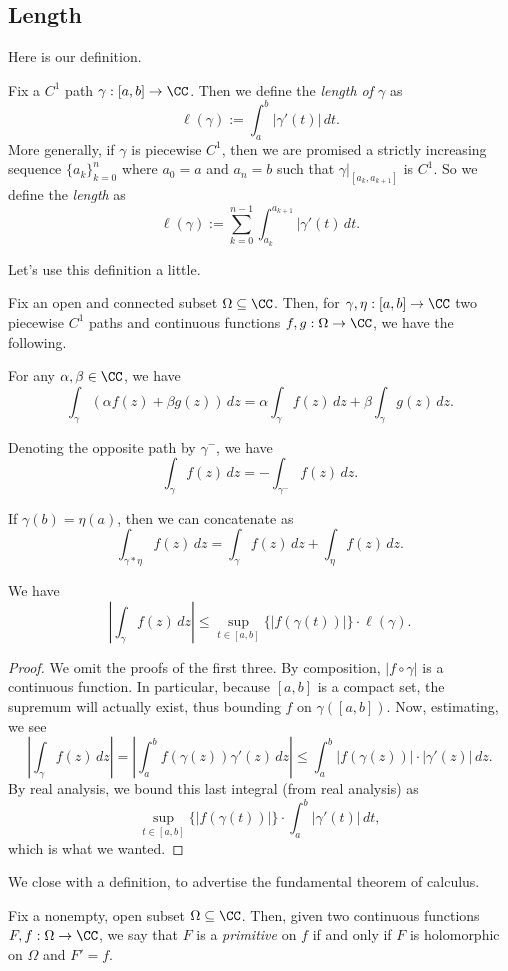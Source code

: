 \subsection{Length}
Here is our definition.
\begin{definition}[Length]
	Fix a $C^1$ path $\gamma:[a,b]\to\CC$. Then we define the \textit{length of $\gamma$} as
	\[\ell(\gamma):=\int_a^b|\gamma'(t)|\,dt.\]
	More generally, if $\gamma$ is piecewise $C^1$, then we are promised a strictly increasing sequence $\{a_k\}_{k=0}^n$ where $a_0=a$ and $a_n=b$ such that $\gamma|_{[a_k,a_{k+1}]}$ is $C^1$. So we define the \textit{length} as
	\[\ell(\gamma):=\sum_{k=0}^{n-1}\int_{a_k}^{a_{k+1}}|\gamma'(t)\,dt.\]
\end{definition}
Let's use this definition a little.
\begin{proposition}
	Fix an open and connected subset $\Omega\subseteq\CC$. Then, for $\gamma,\eta:[a,b]\to\CC$ two piecewise $C^1$ paths and continuous functions $f,g:\Omega\to\CC$, we have the following.
	\begin{listalph}
		\item For any $\alpha,\beta\in\CC$, we have
		\[\int_\gamma(\alpha f(z)+\beta g(z))\,dz=\alpha\int_\gamma f(z)\,dz+\beta\int_\gamma g(z)\,dz.\]
		\item Denoting the opposite path by $\gamma^-$, we have
		\[\int_\gamma f(z)\,dz=-\int_{\gamma^-}f(z)\,dz.\]
		\item If $\gamma(b)=\eta(a)$, then we can concatenate as
		\[\int_{\gamma*\eta}f(z)\,dz=\int_\gamma f(z)\,dz+\int_\eta f(z)\,dz.\]
		\item We have
		\[\left|\int_\gamma f(z)\,dz\right|\le\sup_{t\in[a,b]}\{|f(\gamma(t))|\}\cdot\ell(\gamma).\]
	\end{listalph}
\end{proposition}
\begin{proof}
	We omit the proofs of the first three. By composition, $|f\circ\gamma|$ is a continuous function. In particular, because $[a,b]$ is a compact set, the supremum will actually exist, thus bounding $f$ on $\gamma([a,b])$.  Now, estimating, we see
	\[\left|\int_\gamma f(z)\,dz\right|=\left|\int_a^bf(\gamma(z))\gamma'(z)\,dz\right|\le\int_a^b|f(\gamma(z))|\cdot|\gamma'(z)|\,dz.\]
	By real analysis, we bound this last integral (from real analysis) as
	\[\sup_{t\in[a,b]}\{|f(\gamma(t))|\}\cdot\int_a^b|\gamma'(t)|\,dt,\]
	which is what we wanted.
\end{proof}
We close with a definition, to advertise the fundamental theorem of calculus.
\begin{definition}[Primitive]
	Fix a nonempty, open subset $\Omega\subseteq\CC$. Then, given two continuous functions $F,f:\Omega\to\CC$, we say that $F$ is a \textit{primitive} on $f$ if and only if $F$ is holomorphic on $\Omega$ and $F'=f$.
\end{definition}